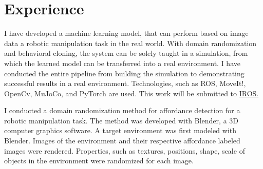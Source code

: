 \documentclass[]{deedy-resume}
\begin{document}
\begin{minipage}[t]{0.66\textwidth} 


\section{Experience}
I have developed a machine learning model, that can perform based on image data a robotic manipulation task in the real world. With domain randomization and behavioral cloning, the system can be solely taught in a simulation, from which the learned model can be transferred into a real environment. I have conducted the entire pipeline from building the simulation to demonstrating successful results in a real environment. Technologies, such as ROS, MoveIt!, OpenCv, MuJoCo, and PyTorch are used. This work will be submitted to \href{https://iros2019.org}{\underline{IROS}.}     
\sectionsep

I conducted a domain randomization method for affordance detection for a robotic manipulation task. The method was developed with Blender, a 3D computer graphics software. A target environment was first modeled with Blender. Images of the environment and their respective affordance labeled images were rendered. Properties, such as textures, positions, shape, scale of objects in the environment were randomized for each image.   

\sectionsep


\end{minipage}
\end{document}
